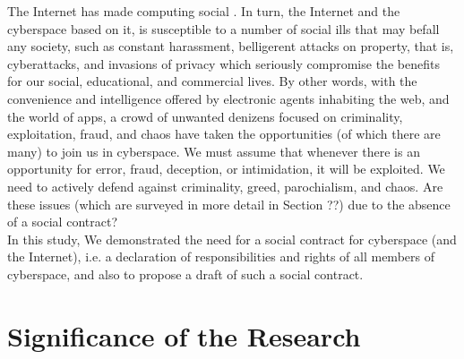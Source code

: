 The Internet has made computing social  \cite{parameswaran2007social}. In turn, the Internet and the cyberspace based on it, is susceptible to a number of social ills that may befall any society, such as constant harassment, belligerent attacks on property, that is, cyberattacks, and invasions of privacy which seriously compromise the benefits for our social, educational, and commercial lives. By other words, with the convenience and intelligence offered by electronic agents inhabiting the web, and the world of apps, a crowd of unwanted denizens focused on criminality, exploitation, fraud, and chaos have taken the opportunities (of which there are many) to join us in cyberspace.  We must assume that whenever there is an opportunity for error, fraud, deception, or intimidation, it will be exploited. We need to actively defend against criminality, greed, parochialism, and chaos. Are these issues (which are surveyed in more detail in Section ??) due to the absence of a social contract? \\ In this study, We demonstrated the need for a social contract for cyberspace (and the Internet), i.e. a declaration of responsibilities and rights of all members of cyberspace, and also to propose a draft of such a social contract.
\fi

\section{Significance of the Research}

